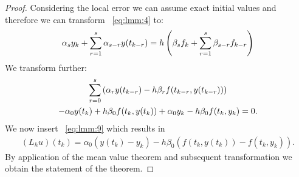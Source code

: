 \begin{proof}
  Considering the local error we can assume exact initial values 
  and therefore we can transform ~\ref{eq:lmm:4} to:
  \begin{gather*}
    \alpha_s y_k + \sum\limits_{r=1}^s \alpha_{s-r} y(t_{k-r})
    = h \left( \beta_s f_k + \sum\limits_{r=1}^s \beta_{s-r} f_{k-r} \right)
  \end{gather*}
  We transform further:
  \begin{multline*}
    \sum\limits_{r=0}^{s} \left( \alpha_r y(t_{k-r})
      - h \beta_r f(t_{k-r},y(t_{k-r})) \right)
    \\
    - \alpha_0 y(t_k) + h \beta_0 f(t_k, y(t_k)) + \alpha_0 y_k
    - h \beta_0 f(t_k,y_k) = 0.
  \end{multline*}
	We now insert ~\ref{eq:lmm:9} which results in
  \begin{gather*}
    (L_h u)(t_k) = \alpha_0 \left( y(t_k) - y_k \right) - h \beta_0 \left( f(t_k,y(t_k)) - f(t_k,y_k) \right).
  \end{gather*}
  By application of the mean value theorem and 
  subsequent transformation we obtain the statement of the theorem.
\end{proof}





